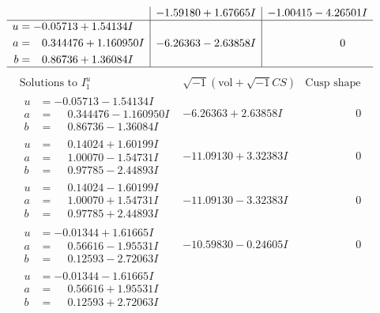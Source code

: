 \documentclass[1p]{elsarticle_modified}
\theoremstyle{definition}
\newcommand{\I}{\sqrt{-1}}
\begin{document}
$$\begin{array}{c|c|c}
 & -1.59180 + 1.67665 I & -1.00415 - 4.26501 I \\ \hline\begin{aligned}
u &= -0.05713 + 1.54134 I \\
a &= \phantom{-}0.344476 + 1.160950 I \\
b &= \phantom{-}0.86736 + 1.36084 I\end{aligned}
 & -6.26363 - 2.63858 I & \phantom{-0.000000 } 0\\
 \hline 
 \end{array}$$\newpage$$\begin{array}{c|c|c}  
\text{Solutions to }I^u_{1}& \I (\text{vol} + \sqrt{-1}CS) & \text{Cusp shape}\\
 \hline 
\begin{aligned}
u &= -0.05713 - 1.54134 I \\
a &= \phantom{-}0.344476 - 1.160950 I \\
b &= \phantom{-}0.86736 - 1.36084 I\end{aligned}
 & -6.26363 + 2.63858 I & \phantom{-0.000000 } 0 \\ \hline\begin{aligned}
u &= \phantom{-}0.14024 + 1.60199 I \\
a &= \phantom{-}1.00070 - 1.54731 I \\
b &= \phantom{-}0.97785 - 2.44893 I\end{aligned}
 & -11.09130 + 3.32383 I & \phantom{-0.000000 } 0 \\ \hline\begin{aligned}
u &= \phantom{-}0.14024 - 1.60199 I \\
a &= \phantom{-}1.00070 + 1.54731 I \\
b &= \phantom{-}0.97785 + 2.44893 I\end{aligned}
 & -11.09130 - 3.32383 I & \phantom{-0.000000 } 0 \\ \hline\begin{aligned}
u &= -0.01344 + 1.61665 I \\
a &= \phantom{-}0.56616 - 1.95531 I \\
b &= \phantom{-}0.12593 - 2.72063 I\end{aligned}
 & -10.59830 - 0.24605 I & \phantom{-0.000000 } 0 \\ \hline\begin{aligned}
u &= -0.01344 - 1.61665 I \\
a &= \phantom{-}0.56616 + 1.95531 I \\
b &= \phantom{-}0.12593 + 2.72063 I\end{aligned}

\end{array}$$
\end{document}
